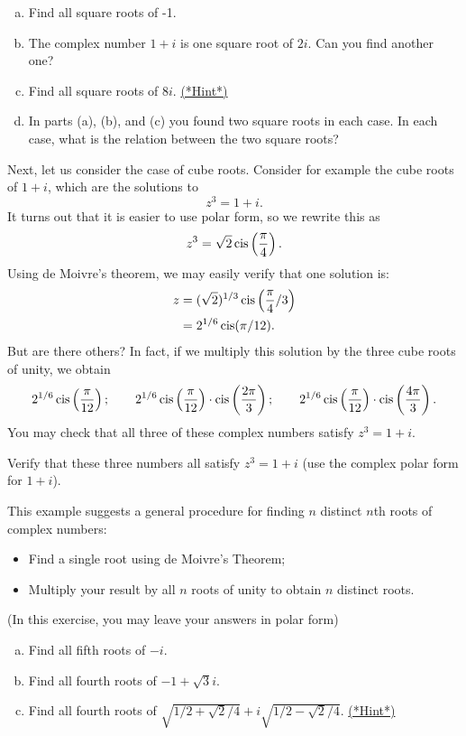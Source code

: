 {\begin{exercise}{58}
\begin{enumerate}[(a)]
\item
Find all square roots of -1.
\item
The complex number $1 + i$ is one square root of $2i$. Can you find another one?
\item
Find all square roots of $8i$.
\hyperref[sec:complex:hints]{(*Hint*)}
\item 
In parts (a), (b), and (c) you found two square roots in each case. In each case, what is the relation between the two square roots?
\end{enumerate}
\end{exercise}
Next, let us consider the case of cube roots. Consider for example the cube roots of $1 + i$, which are the solutions to
\[ z^3 = 1 + i. \]
It turns out that it is easier to use polar form, so we rewrite this as
\[ z^3 = \sqrt{2} \operatorname{cis}\left(\frac{\pi}{4}\right). \]
Using de Moivre's theorem, we may easily verify that one solution is:
\begin{align*}
z &= (\sqrt{2})^{1/3} \operatorname{cis} \left( \frac{\pi}{4}/3 \right) \\
&= 2^{1/6} \operatorname{cis}(\pi/12).
\end{align*}
But are there others? In fact, if we multiply this solution by the three cube roots of unity, we obtain
\[ 2^{1/6} \operatorname{cis}\left(\frac{\pi}{12}\right); \qquad 2^{1/6} \operatorname{cis}\left(\frac{\pi}{12}\right) \cdot \operatorname{cis}\left(\frac{2\pi}{3}\right); \qquad 2^{1/6} \operatorname{cis}\left(\frac{\pi}{12}\right) \cdot \operatorname{cis}\left(\frac{4\pi}{3}\right). \]
You may check that all three of these complex numbers satisfy $z^3 = 1 + i$.

\begin{exercise}{59}
Verify that these three numbers all satisfy $z^3 = 1 + i$ (use the complex polar form for $1 + i$).
\end{exercise}
This example suggests a general procedure for finding $n$ distinct $n$th roots of complex numbers:
\begin{itemize}
\item Find a single root using de Moivre's Theorem;
\item Multiply your result by all $n$ roots of unity to obtain $n$ distinct roots.
\end{itemize}

\begin{exercise}{60}
(In this exercise, you may leave your answers in polar form)
\begin{enumerate}[(a)]
\item
Find all fifth roots of $-i$.
\item
Find all fourth roots of $-1 + \sqrt{3}i$.
\item
Find all fourth roots of $ \sqrt{1/2 + \sqrt{2}/4} + i\sqrt{1/2 - \sqrt{2}/4}$. 
\hyperref[sec:complex:hints]{(*Hint*)}
\end{enumerate}
\end{exercise}


}
